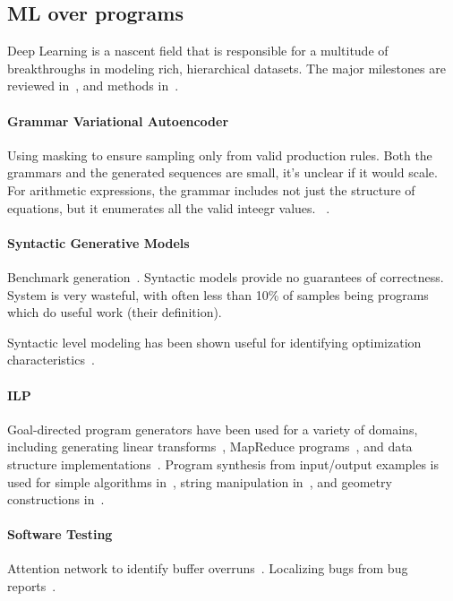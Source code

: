 \subsection{ML over programs} 

Deep Learning is a nascent field that is responsible for a multitude of breakthroughs in modeling rich, hierarchical datasets. The major milestones are reviewed in~\cite{Wang2017}, and methods in~\cite{Schmidhuber2014}.

\paragraph{Grammar Variational Autoencoder} Using masking to ensure sampling only from valid production rules. Both the grammars and the generated sequences are small, it's unclear if it would scale. For arithmetic expressions, the grammar includes not just the structure of equations, but it enumerates all the valid inteegr values. ~\cite{Kusner2017}.

\paragraph{Syntactic Generative Models} Benchmark generation~\cite{Cummins2017a}. Syntactic models provide no guarantees of correctness. System is very wasteful, with often less than 10\% of samples being programs which do useful work (their definition).

Syntactic level modeling has been shown useful for identifying optimization characteristics~\cite{Cummins2017b}.

\paragraph{ILP} Goal-directed program generators have been used for a variety of domains, including generating linear transforms~\cite{Voronenko2009}, MapReduce programs~\cite{Smith}, and data structure implementations~\cite{Loncaric2016}. Program synthesis from input/output examples is used for simple algorithms in~\cite{Zaremba2015a}, string manipulation in~\cite{Gulwani2011}, and geometry constructions in~\cite{Gulwani2012}.

\paragraph{Software Testing} Attention network to identify buffer overruns~\cite{Choi2016}. Localizing bugs from bug reports~\cite{Lam2016,Huo2016}.

